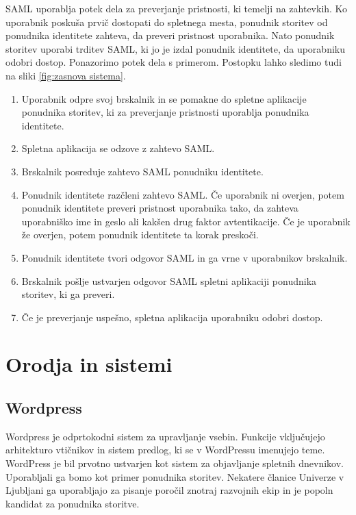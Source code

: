 \documentclass[a4paper,12pt,openright,oneside]{book}
\begin{document}
SAML uporablja potek dela za preverjanje pristnosti, ki temelji na zahtevkih. Ko uporabnik poskuša prvič dostopati do spletnega mesta, ponudnik storitev od ponudnika identitete zahteva, da preveri pristnost uporabnika. Nato ponudnik storitev uporabi trditev SAML, ki jo je izdal ponudnik identitete, da uporabniku odobri dostop. Ponazorimo potek dela s primerom. Postopku lahko sledimo tudi na sliki \ref{fig:zasnova sistema}.
\begin{enumerate}
    \item Uporabnik odpre svoj brskalnik in se pomakne do spletne aplikacije ponudnika storitev, ki za preverjanje pristnosti uporablja ponudnika identitete.
    \item Spletna aplikacija se odzove z zahtevo SAML.
    \item Brskalnik posreduje zahtevo SAML ponudniku identitete.
    \item Ponudnik identitete razčleni zahtevo SAML. Če uporabnik ni overjen, potem ponudnik identitete preveri pristnost uporabnika tako, da zahteva uporabniško ime in geslo ali kakšen drug faktor avtentikacije. Če je uporabnik že overjen, potem ponudnik identitete ta korak preskoči.
    \item Ponudnik identitete tvori odgovor SAML in ga vrne v uporabnikov brskalnik.
    \item Brskalnik pošlje ustvarjen odgovor SAML spletni aplikaciji ponudnika storitev, ki ga preveri.
    \item Če je preverjanje uspešno, spletna aplikacija uporabniku odobri dostop.
\end{enumerate}

\section{Orodja in sistemi}
\subsection{Wordpress}
Wordpress \cite{wordpress} je odprtokodni sistem za upravljanje vsebin. Funkcije vključujejo arhitekturo vtičnikov in sistem predlog, ki se v WordPressu imenujejo teme. WordPress je bil prvotno ustvarjen kot sistem za objavljanje spletnih dnevnikov.
\newline
Uporabljali ga bomo kot primer ponudnika storitev. Nekatere članice Univerze v Ljubljani ga uporabljajo za pisanje poročil znotraj razvojnih ekip in je popoln kandidat za ponudnika storitve. 
\end{document}
